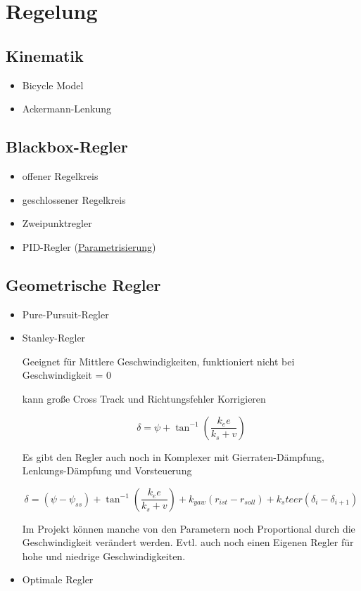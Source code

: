 \documentclass[a4paper]{article}
\title{\docTitle}
\author{Moritz}
\date{\today}
\begin{document}
\maketitle
\tableofcontents


\section{Regelung}

\subsection{Kinematik}

\begin{itemize}
    \item Bicycle Model
    \item Ackermann-Lenkung
\end{itemize}

\subsection{Blackbox-Regler}

\begin{itemize}
    \item offener Regelkreis
    \item geschlossener Regelkreis
    \item Zweipunktregler
    \item PID-Regler (\href{https://www.youtube.com/watch?v=4Y7zG48uHRo}{Parametrisierung})
\end{itemize}

\subsection{Geometrische Regler}

\begin{itemize}
    \item Pure-Pursuit-Regler
    \item Stanley-Regler 
    
    Geeignet für Mittlere Geschwindigkeiten, funktioniert nicht bei Geschwindigkeit = 0
    
    kann große Cross Track und Richtungsfehler Korrigieren

    $$\delta = \psi + \tan^{-1}\left(\frac{k_e e}{k_s + v}\right)$$

    Es gibt den Regler auch noch in Komplexer mit Gierraten-Dämpfung, Lenkungs-Dämpfung und Vorsteuerung

    $$\delta = (\psi - \psi_{ss}) + \tan^{-1}\left(\frac{k_e e}{k_s + v}\right) + k_{yaw}(r_{ist} - r_{soll}) + k_steer(\delta_i - \delta_{i+1})$$

    Im Projekt können manche von den Parametern noch Proportional durch die Geschwindigkeit verändert werden. Evtl. auch noch einen Eigenen Regler für hohe und niedrige Geschwindigkeiten.
    \item Optimale Regler
\end{itemize}
\end{document}
